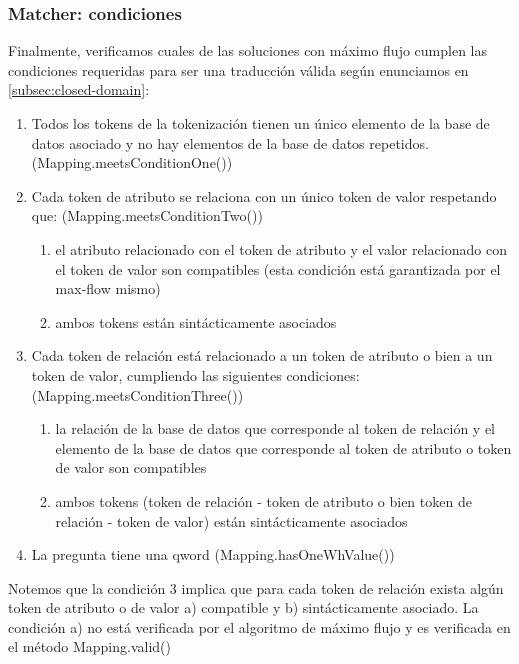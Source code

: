 \begin{frame}
\frametitle{Matcher: condiciones}

Finalmente, verificamos cuales de las soluciones con máximo flujo cumplen las condiciones requeridas para ser una traducción válida según enunciamos en \ref{subsec:closed-domain}:

\begin{enumerate}
\item Todos  los tokens de la tokenización tienen un único elemento de la base de datos asociado y no hay elementos de la base de datos repetidos. (Mapping.meetsConditionOne())
\item Cada token de atributo se relaciona con un único token de valor respetando que: (Mapping.meetsConditionTwo())
\begin{enumerate}
\item el atributo relacionado con el token de atributo y el valor relacionado con el token de valor son compatibles (esta condición está garantizada por el max-flow mismo)
\item ambos tokens están sintácticamente asociados
\end{enumerate}
\item Cada token de relación está relacionado a un token de atributo o bien a un token de valor, cumpliendo las siguientes condiciones: (Mapping.meetsConditionThree())
\begin{enumerate}
\item la relación de la base de datos que corresponde al token de relación y el elemento de la base de datos que corresponde al token de atributo o token de valor son compatibles
\item ambos tokens (token de relación - token de atributo o bien token de relación - token de valor) están sintácticamente asociados
\end{enumerate}
\item La pregunta tiene una qword (Mapping.hasOneWhValue())
\end{enumerate}

Notemos que la condición 3 implica que para cada token de relación exista algún token de atributo o de valor a) compatible y b) sintácticamente asociado. La condición a) no está verificada por el algoritmo de máximo flujo y es verificada en el método Mapping.valid()

\end{frame}

